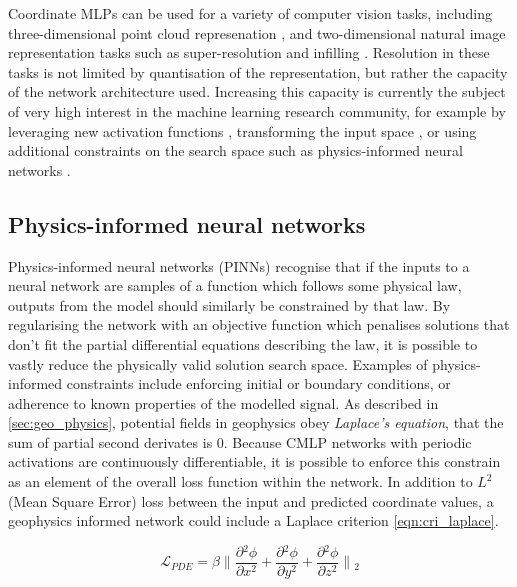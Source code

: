 \documentclass[manuscript.tex]{subfiles}
\begin{document}
Coordinate MLPs can be used for a variety of computer vision tasks, including three-dimensional point cloud represenation \parencite{qiPointNetDeepHierarchical2017}, and two-dimensional natural image representation tasks such as super-resolution and infilling \parencite{leeLocalTextureEstimator2022,chenLearningContinuousImage2021}.
Resolution in these tasks is not limited by quantisation of the representation, but rather the capacity of the network architecture used.
Increasing this capacity is currently the subject of very high interest in the machine learning research community, for example by leveraging new activation functions \parencite{saragadamWIREWaveletImplicit2023}, transforming the input space \parencite[e.g.][]{benbarkaSeeingImplicitNeural2022}, or using additional constraints on the search space such as physics-informed neural networks \parencite{raissiPhysicsinformedNeuralNetworks2019}.

\subsection{Physics-informed neural networks}
\label{sec:pinn}
Physics-informed neural networks (PINNs) recognise that if the inputs to a neural network are samples of a function which follows some physical law, outputs from the model should similarly be constrained by that law.
By regularising the network with an objective function which penalises solutions that don't fit the partial differential equations describing the law, it is possible to vastly reduce the physically valid solution search space.
Examples of physics-informed constraints include enforcing initial or boundary conditions, or adherence to known properties of the modelled signal.
As described in \cref{sec:geo_physics}, potential fields in geophysics obey \emph{Laplace's equation}, that the sum of partial second derivates is 0.
Because CMLP networks with periodic activations are continuously differentiable, it is possible to enforce this constrain as an element of the overall loss function within the network.
In addition to \(L^2\) (Mean Square Error) loss between the input and predicted coordinate values, a geophysics informed network could include a Laplace criterion \cref*{eqn:cri_laplace}.

\begin{equation}
    \label{eqn:cri_laplace}
    \mathcal{L}_{PDE} = \beta{}\lVert{}\frac{\partial{}^2\phi}{\partial{}x^2} + \frac{\partial{}^2\phi}{\partial{}y^2} + \frac{\partial{}^2\phi}{\partial{}z^2}\rVert{}_{2}
\end{equation}
\end{document}
